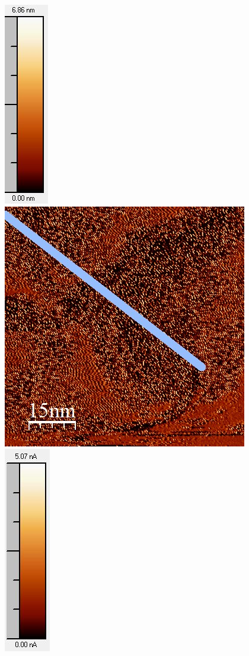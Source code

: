\documentclass[12pt,a4paper]{article}
\begin{document}
\begin{figure}[H]
\includegraphics[scale=0.6]{Bilder/Anhang/IGain/8000_IGain_nach_Skala.jpg}
\includegraphics[scale=0.6]{Bilder/Anhang/IGain/Strom/8000_IGain_Strom_vor.jpg}
\includegraphics[scale=0.6]{Bilder/Anhang/IGain/Strom/8000_IGain_Strom_vor_Skala.jpg}

\end{figure}
\end{document}
